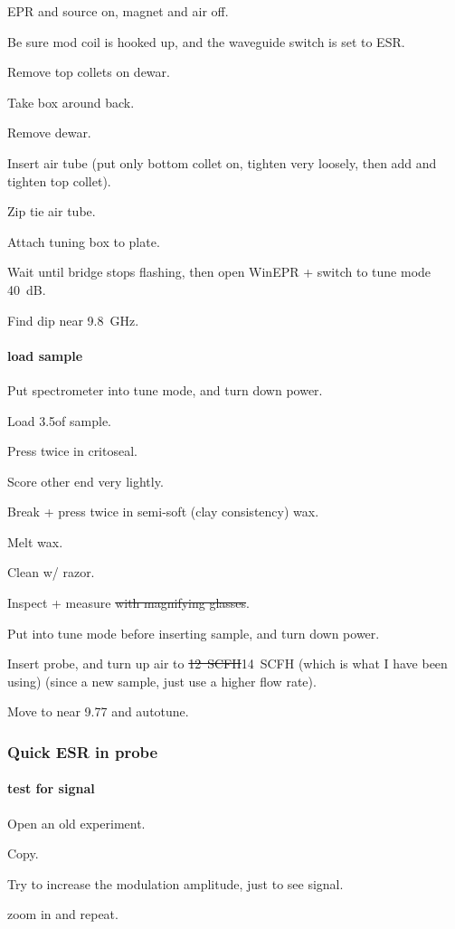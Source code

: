 EPR and source on, magnet and air off.

Be sure mod coil is hooked up, and the waveguide switch is set to ESR.

Remove top collets on dewar.

Take box around back.

Remove dewar.

Insert air tube (put only bottom collet on, tighten very loosely, then add and tighten top collet).

Zip tie air tube.

Attach tuning box to plate.

Wait until bridge stops flashing, then open WinEPR + switch to tune mode 40~dB.

Find dip near 9.8~GHz.

\paragraph{load sample}
Put spectrometer into tune mode, and turn down power.

Load 3.5\uL of sample.

Press twice in critoseal.

Score other end very lightly.

Break + press twice in semi-soft (clay consistency) wax.

Melt wax.

Clean w/ razor.

Inspect + measure\sout{ with magnifying glasses}.

Put into tune mode before inserting sample, and turn down power.

Insert probe, and turn up air to \sout{12~SCFH}14~SCFH (which is what I have been using) (since a new sample, just use a higher flow rate).

Move to near 9.77 and autotune.

\subsubsection{Quick ESR in probe}
\paragraph{test for signal}
Open an old experiment.

Copy.

Try to increase the modulation amplitude, just to see signal.

zoom in and repeat.

